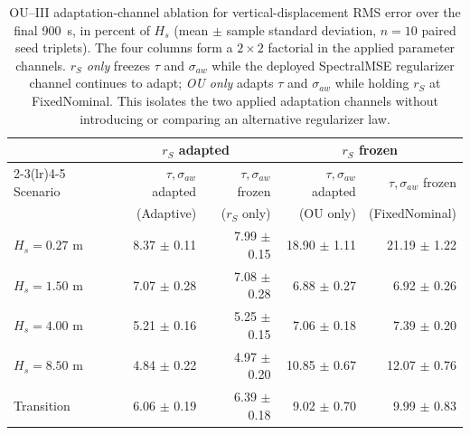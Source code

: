 \begin{table}[t]
  \centering
  \caption{OU--III adaptation-channel ablation for vertical-displacement RMS error over the final \SI{900}{s}, in percent of $H_s$ (mean $\pm$ sample standard deviation, $n=10$ paired seed triplets). The four columns form a $2\times2$ factorial in the applied parameter channels. \emph{$r_S$ only} freezes $\tau$ and $\sigma_{aw}$ while the deployed SpectralMSE regularizer channel continues to adapt; \emph{OU only} adapts $\tau$ and $\sigma_{aw}$ while holding $r_S$ at FixedNominal. This isolates the two applied adaptation channels without introducing or comparing an alternative regularizer law.}
  \label{tab:ou_mc_channels}
  \footnotesize
  \setlength{\tabcolsep}{4.0pt}
  \begin{tabular}{@{}lrrrr@{}}
    \toprule
    & \multicolumn{2}{c}{$r_S$ adapted} & \multicolumn{2}{c}{$r_S$ frozen} \\
    \cmidrule(lr){2-3}\cmidrule(lr){4-5}
    Scenario & $\tau,\sigma_{aw}$ adapted & $\tau,\sigma_{aw}$ frozen & $\tau,\sigma_{aw}$ adapted & $\tau,\sigma_{aw}$ frozen \\
    & (Adaptive) & ($r_S$ only) & (OU only) & (FixedNominal) \\
    \midrule
    $H_s=0.27$ m & 8.37 $\pm$ 0.11 & 7.99 $\pm$ 0.15 & 18.90 $\pm$ 1.11 & 21.19 $\pm$ 1.22 \\
    $H_s=1.50$ m & 7.07 $\pm$ 0.28 & 7.08 $\pm$ 0.28 & 6.88 $\pm$ 0.27 & 6.92 $\pm$ 0.26 \\
    $H_s=4.00$ m & 5.21 $\pm$ 0.16 & 5.25 $\pm$ 0.15 & 7.06 $\pm$ 0.18 & 7.39 $\pm$ 0.20 \\
    $H_s=8.50$ m & 4.84 $\pm$ 0.22 & 4.97 $\pm$ 0.20 & 10.85 $\pm$ 0.67 & 12.07 $\pm$ 0.76 \\
    Transition & 6.06 $\pm$ 0.19 & 6.39 $\pm$ 0.18 & 9.02 $\pm$ 0.70 & 9.99 $\pm$ 0.83 \\
    \bottomrule
  \end{tabular}
\end{table}


